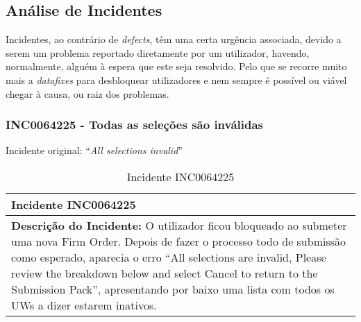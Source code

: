     \subsection{Análise de Incidentes}\label{sub:incidentes}

        Incidentes, ao contrário de \textit{defects}, têm uma certa urgência associada, devido a serem um problema reportado diretamente por um utilizador, havendo, normalmente, alguém à espera que este seja resolvido. Pelo que se recorre muito mais a \textit{datafixes} para desbloquear utilizadores e nem sempre é possível ou viável chegar à causa, ou raiz dos problemas.


        \subsubsection{INC0064225 - Todas as seleções são inválidas}\label{secsec:inc0064225} %

            Incidente original: ``\textit{All selections invalid}''


            \begin{table}[H] %
                \centering
                \begin{tabularx}{1\textwidth}{|>{\raggedright\arraybackslash}X|}
                    \hline
                    \rowcolor{lightgray}
                    \textbf{Incidente INC0064225} \\
                    \hline
                    \rowcolor{lightgray!20}
                
                    \textbf{Descrição do Incidente:} O utilizador ficou bloqueado ao submeter uma nova Firm Order. Depois de fazer o processo todo de submissão como esperado, aparecia o erro ``All selections are invalid, Please review the breakdown below and select Cancel to return to the Submission Pack'', apresentando por baixo uma lista com todos os UWs a dizer estarem inativos.

                    \\
                    \hline
                \end{tabularx}
                \caption{Incidente INC0064225}\label{table:usincINC0064225}
            \end{table}

